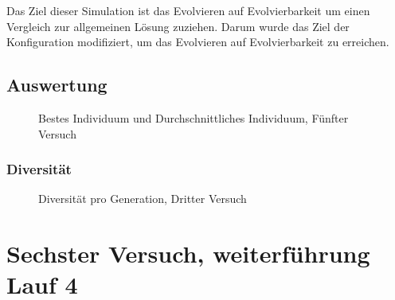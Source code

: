        Das Ziel dieser Simulation ist das Evolvieren auf Evolvierbarkeit um einen Vergleich zur allgemeinen Lösung zuziehen.
        Darum wurde das Ziel der Konfiguration modifiziert, um das Evolvieren auf Evolvierbarkeit zu erreichen.

      \subsection{Auswertung\label{sub:fifthAuswertung}}

        \begin{figure}[H]
          \centering
          
          \caption{Bestes Individuum und Durchschnittliches Individuum, Fünfter Versuch\label{fig:graphFifth}}
        \end{figure}

      \subsubsection{Diversität}

        \begin{figure}[H]
          \centering
          
          \caption{Diversität pro Generation, Dritter Versuch\label{fig:graphDivFourth}}
        \end{figure}

    \section{Sechster Versuch, weiterführung Lauf 4 \label{sec:sixthSimulation}}
